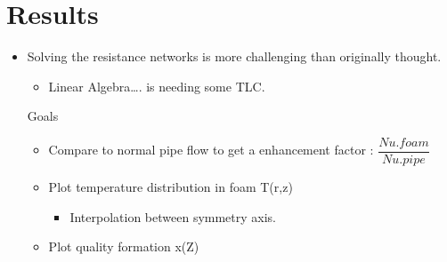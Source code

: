\documentclass[compileTAMUreport.tex]{subfiles}
\begin{document}
\chapter{Results}
\begin{itemize}
\item Solving the resistance networks is more challenging than originally thought.
\begin{itemize}
\item Linear Algebra…. is needing some TLC.
\end{itemize}
Goals 
\begin{itemize}
\item
Compare to normal pipe flow to get a enhancement factor :               
$\dfrac{Nu.foam}{Nu.pipe}$ 
\item Plot temperature distribution in foam T(r,z)
\begin{itemize}
\item Interpolation between symmetry axis.
\end{itemize}
\item Plot quality formation x(Z)
\end{itemize}
\end{itemize}
\end{document}
